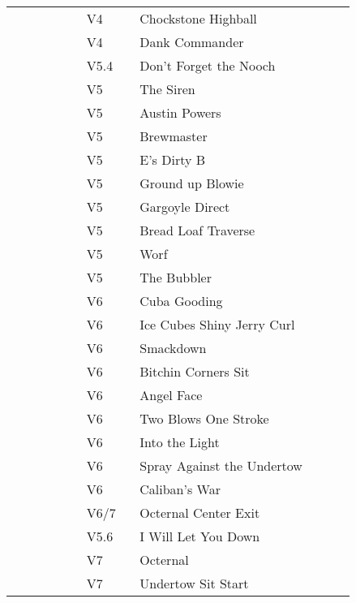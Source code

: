 \begin{flushleft}
\begin{center}
\begin{supertabular}{p{0.18\linewidth}p{0.13\linewidth}p{0.45\linewidth}p{0.08\linewidth}}
&V4&Chockstone Highball & \pageref{rt:Chockstone Highball} \\
&V4&Dank Commander & \pageref{rt:Dank Commander} \\
&V5.4&Don't Forget the Nooch & \pageref{rt:Don't Forget the Nooch} \\
   &V5&The Siren & \pageref{rt:The Siren} \\
  &V5&Austin Powers & \pageref{rt:Austin Powers} \\
  &V5&Brewmaster & \pageref{rt:Brewmaster} \\
  &V5&E's Dirty B & \pageref{rt:E's Dirty B} \\
  &V5&Ground up Blowie & \pageref{rt:Ground up Blowie} \\
  &V5&Gargoyle Direct & \pageref{vr:Gargoyle Direct} \\
  &V5&Bread Loaf Traverse & \pageref{rt:Bread Loaf Traverse} \\
  &V5&Worf & \pageref{rt:Worf} \\
&V5&The Bubbler & \pageref{rt:The Bubbler} \\
  &V6&Cuba Gooding & \pageref{rt:Cuba Gooding} \\
  &V6&Ice Cubes Shiny Jerry Curl & \pageref{rt:Ice Cubes Shiny Jerry Curl} \\
  &V6&Smackdown & \pageref{rt:Smackdown} \\
  &V6&Bitchin Corners Sit & \pageref{vr:Bitchin Corners Sit} \\
&V6&Angel Face & \pageref{rt:Angel Face} \\
&V6&Two Blows One Stroke & \pageref{rt:Two Blows One Stroke} \\
&V6&Into the Light & \pageref{rt:Into the Light} \\
&V6&Spray Against the Undertow & \pageref{vr:Spray Against the Undertow} \\
&V6&Caliban's War & \pageref{rt:Caliban's War} \\
  &V6/7&Octernal Center Exit & \pageref{vr:Octernal Center Exit} \\
  &V5.6&I Will Let You Down & \pageref{rt:I Will Let You Down} \\
   &V7&Octernal & \pageref{rt:Octernal} \\
   &V7&Undertow Sit Start & \pageref{vr:Undertow Sit Start} \\

\end{supertabular}
\end{center}
\end{flushleft}
